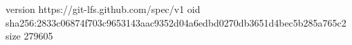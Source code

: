 version https://git-lfs.github.com/spec/v1
oid sha256:2833c06874f703c9653143aac9352d04a6edbd0270db3651d4bec5b285a765c2
size 279605
